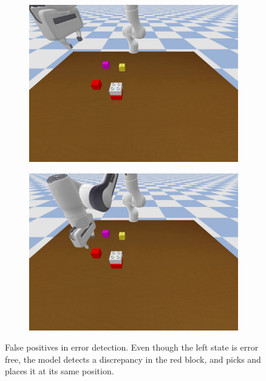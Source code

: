 \begin{figure}
    \centering
    \begin{subfigure}{.3\textwidth}
        \includegraphics[width=\textwidth]{assets/fp-1.jpg}
    \end{subfigure}
    \hspace{0.3cm}
    \begin{subfigure}{.3\textwidth}
        \includegraphics[width=\textwidth]{assets/fp-2.jpg}
    \end{subfigure}
    
    \caption{False positives in error detection. Even though the left state is error free, the model detects a discrepancy in the red block, and picks and places it at its same position.}
    \label{fig:fp}
\end{figure}

